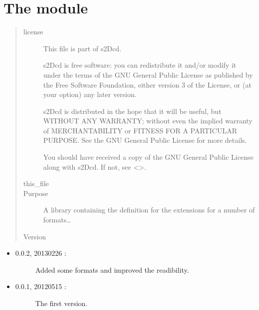 \documentclass[letterpaper,10pt,english]{sphinxmanual}
\begin{document}
\section{The  module}
\label{\detokenize{appendices:module-s2Dcd.ext}}\label{\detokenize{appendices:the-s2dcd-ext-module}}\begin{quote}\begin{description}
\item[{license}] \leavevmode
This file is part of s2Dcd.

s2Dcd is free software: you can redistribute it and/or modify
it under the terms of the GNU General Public License as published by
the Free Software Foundation, either version 3 of the License, or
(at your option) any later version.

s2Dcd is distributed in the hope that it will be useful,
but WITHOUT ANY WARRANTY; without even the implied warranty of
MERCHANTABILITY or FITNESS FOR A PARTICULAR PURPOSE.  See the
GNU General Public License for more details.

You should have received a copy of the GNU General Public License
along with s2Dcd.  If not, see \textless{}\textgreater{}.

\item[{this\_file}] \leavevmode
{}

\item[{Purpose}] \leavevmode
A library containing the definition for the extensions for a number
of formats…

\item[{Version}] \leavevmode
\end{description}\end{quote}
\begin{itemize}
\item {} \begin{description}
\item[{0.0.2, 2013\sphinxhyphen{}02\sphinxhyphen{}26 :}] \leavevmode
Added some formats and improved the readibility.

\end{description}

\item {} \begin{description}
\item[{0.0.1, 2012\sphinxhyphen{}05\sphinxhyphen{}15 :}] \leavevmode
The first version.

\end{description}

\end{itemize}
\end{document}
